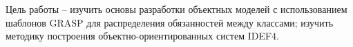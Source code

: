 Цель работы -- изучить основы разработки объектных моделей с использованием
шаблонов GRASP для распределения обязанностей между классами; изучить методику
построения объектно-ориентированных систем IDEF4.
